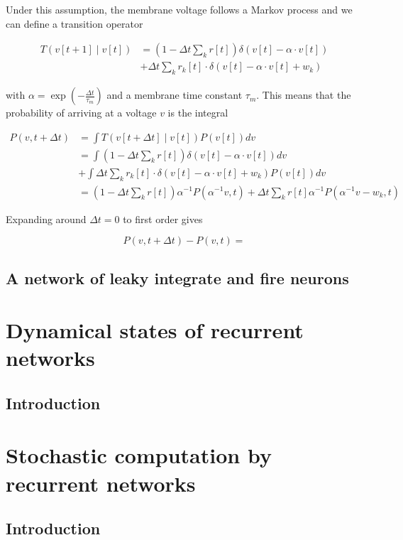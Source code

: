 \documentclass{ucetd}
\begin{document}
Under this assumption, the membrane voltage follows a Markov process and we can define a transition operator

\begin{align*}
T(v[t+1]\;|\;v[t]) &= \left(1-\Delta t\sum_{k}r[t]\right)\delta\left(v[t]-\alpha\cdot v[t]\right)\\
&+ \Delta t\sum_{k}r_{k}[t]\cdot\delta\left(v[t]-\alpha \cdot v[t] + w_{k}\right)
\end{align*}

with $\alpha = \exp\left(-\frac{\Delta t}{\tau_{m}}\right)$ and a membrane time constant $\tau_{m}$. This means that the probability of arriving at a voltage $v$ is the integral

\begin{align*}
P(v,t+\Delta t) &= \int T(v[t+\Delta t]\;|\;v[t])P(v[t])dv\\
&= \int \left(1-\Delta t\sum_{k}r[t]\right)\delta\left(v[t]-\alpha\cdot v[t]\right)dv\\
&+ \int \Delta t\sum_{k}r_{k}[t]\cdot\delta\left(v[t]-\alpha \cdot v[t] + w_{k}\right)P(v[t])dv\\
&= \left(1-\Delta t\sum_{k}r[t]\right)\alpha^{-1}P(\alpha^{-1}v,t) + \Delta t \sum_{k}r[t] \alpha^{-1}P(\alpha^{-1}v-w_{k},t)
\end{align*}

Expanding around $\Delta t = 0$ to first order gives

\begin{equation*}
P(v,t+\Delta t) - P(v,t) = 
\end{equation*}

\section{A network of leaky integrate and fire neurons}


\chapter{Dynamical states of recurrent networks}
\section{Introduction}


\chapter{Stochastic computation by recurrent networks}
\section{Introduction}
\end{document}
